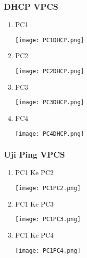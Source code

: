 \documentclass[12pt,a4paper]{article}
\begin{document}
\newpage

\subsubsection*{DHCP VPCS}
\begin{enumerate}
  \item PC1

      \texttt{[image: PC1DHCP.png]}

  \item PC2

      \texttt{[image: PC2DHCP.png]}

  \item PC3

      \texttt{[image: PC3DHCP.png]}

  \item PC4

      \texttt{[image: PC4DHCP.png]}

\end{enumerate}

\subsubsection*{Uji Ping VPCS}
\begin{enumerate}

  \item PC1 Ke PC2

    \texttt{[image: PC1PC2.png]}

  \item PC1 Ke PC3

    \texttt{[image: PC1PC3.png]}

  \item PC1 Ke PC4

    \texttt{[image: PC1PC4.png]}

\end{enumerate}
\end{document}
